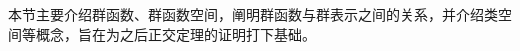 
\begin{issues}
\issueDraft
\issueTODO
\end{issues}

本节主要介绍群函数、群函数空间，阐明群函数与群表示之间的关系，并介绍类空间等概念，旨在为之后正交定理的证明打下基础。

